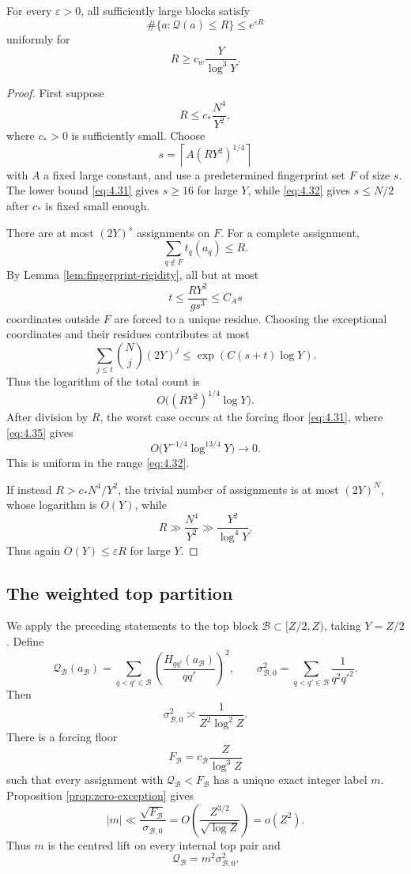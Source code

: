 \begin{proposition}\label{prop:fingerprint-entropy}
For every $\varepsilon>0$, all sufficiently large blocks satisfy
\[
\#\{a:\mathcal Q(a)\le R\}
\le e^{\varepsilon R}
\tag{4.30}\label{eq:4.30}
\]
uniformly for
\[
R\ge c_w\frac{Y}{\log^3Y}.
\tag{4.31}\label{eq:4.31}
\]
\end{proposition}

\begin{proof}
First suppose
\[
R\le c_*\frac{N^4}{Y^2},
\tag{4.32}\label{eq:4.32}
\]
where $c_*>0$ is sufficiently small. Choose
\[
s=\left\lceil A(RY^2)^{1/4}\right\rceil
\tag{4.33}\label{eq:4.33}
\]
with $A$ a fixed large constant, and use a predetermined fingerprint set $F$ of size $s$. The lower bound \eqref{eq:4.31} gives $s\ge16$ for large $Y$, while \eqref{eq:4.32} gives $s\le N/2$ after $c_*$ is fixed small enough.

There are at most $(2Y)^s$ assignments on $F$. For a complete assignment,
\[
\sum_{q\notin F}t_q(a_q)\le R.
\]
By Lemma \ref{lem:fingerprint-rigidity}, all but at most
\[
t\le\frac{RY^2}{gs^3}\le C_A s
\tag{4.34}\label{eq:4.34}
\]
coordinates outside $F$ are forced to a unique residue. Choosing the exceptional coordinates and their residues contributes at most
\[
\sum_{j\le t}\binom Nj(2Y)^j
\le
\exp(C(s+t)\log Y).
\]
Thus the logarithm of the total count is
\[
O\bigl((RY^2)^{1/4}\log Y\bigr).
\tag{4.35}\label{eq:4.35}
\]
After division by $R$, the worst case occurs at the forcing floor \eqref{eq:4.31}, where \eqref{eq:4.35} gives
\[
O\bigl(Y^{-1/4}\log^{13/4}Y\bigr)\longrightarrow0.
\tag{4.36}\label{eq:4.36}
\]
This is uniform in the range \eqref{eq:4.32}.

If instead $R>c_*N^4/Y^2$, the trivial number of assignments is at most $(2Y)^N$, whose logarithm is $O(Y)$, while
\[
R\gg\frac{N^4}{Y^2}\gg\frac{Y^2}{\log^4Y}.
\]
Thus again $O(Y)\le\varepsilon R$ for large $Y$.
\end{proof}

\subsection{The weighted top partition}

We apply the preceding statements to the top block $\mathcal B\subset[Z/2,Z)$, taking $Y=Z/2$. Define
\[
\mathcal Q_{\mathcal B}(a_{\mathcal B})
=
\sum_{q<q'\in\mathcal B}
\left(\frac{H_{qq'}(a_{\mathcal B})}{qq'}\right)^2,
\qquad
\sigma_{\mathcal B,0}^2
=
\sum_{q<q'\in\mathcal B}\frac1{q^2q'^2}.
\tag{4.37}\label{eq:4.37}
\]
Then
\[
\sigma_{\mathcal B,0}^2
\asymp\frac1{Z^2\log^2Z}.
\tag{4.38}\label{eq:4.38}
\]
There is a forcing floor
\[
F_{\mathcal B}=c_{\mathcal B}\frac{Z}{\log^3Z}
\tag{4.39}\label{eq:4.39}
\]
such that every assignment with $\mathcal Q_{\mathcal B}<F_{\mathcal B}$ has a unique exact integer label $m$. Proposition \ref{prop:zero-exception} gives
\[
|m|
\ll
\frac{\sqrt{F_{\mathcal B}}}{\sigma_{\mathcal B,0}}
=
O\!\left(\frac{Z^{3/2}}{\sqrt{\log Z}}\right)
=o(Z^2).
\tag{4.40}\label{eq:4.40}
\]
Thus $m$ is the centred lift on every internal top pair and
\[
\mathcal Q_{\mathcal B}=m^2\sigma_{\mathcal B,0}^2.
\tag{4.41}\label{eq:4.41}
\]

